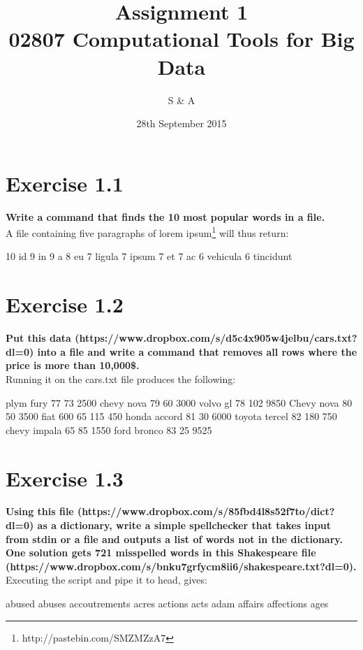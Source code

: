 \documentclass{article}
\title{Assignment 1\\02807 Computational Tools for Big Data}
\author{S \& A}
\date{28th September 2015}
\begin{document}
\maketitle
\newpage
\section{Exercise 1.1}
\textbf{Write a command that finds the 10 most popular words in a file.}\\


A file containing five paragraphs of lorem ipsum\footnote{http://pastebin.com/SMZMZzA7} will thus return:
\begin{pythonOutput}
     10 id
      9 in
      9 a
      8 eu
      7 ligula
      7 ipsum
      7 et
      7 ac
      6 vehicula
      6 tincidunt
\end{pythonOutput}
\section{Exercise 1.2}
\textbf{Put this data (https://www.dropbox.com/s/d5c4x905w4jelbu/cars.txt?dl=0) into a file and write a command that removes all rows where the price is more than 10,000\$.}\\

Running it on the cars.txt file produces the following:
\begin{pythonOutput}
plym    fury    77      73      2500
chevy   nova    79      60      3000
volvo   gl      78      102     9850
Chevy   nova    80      50      3500
fiat    600     65      115     450
honda   accord  81      30      6000
toyota  tercel  82      180     750
chevy   impala  65      85      1550
ford    bronco  83      25      9525
\end{pythonOutput}


\section{Exercise 1.3}
\textbf{Using this file (https://www.dropbox.com/s/85fbd4l8s52f7to/dict?dl=0) as a dictionary, write a simple spellchecker that takes input from stdin or a file and outputs a list of words not in the dictionary. One solution gets 721 misspelled words in this Shakespeare file (https://www.dropbox.com/s/bnku7grfycm8ii6/shakespeare.txt?dl=0).}\\

Executing the script and pipe it to head, gives:
\begin{pythonOutput}
abused
abuses
accoutrements
acres
actions
acts
adam
affairs
affections
ages
\end{pythonOutput}
\end{document}
